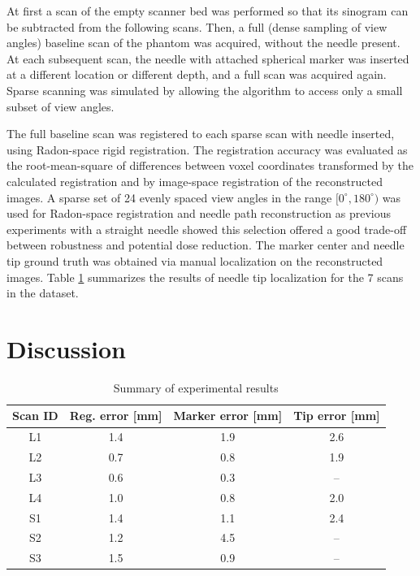 \documentclass[letterpaper, 10 pt, conference]{ieeeconf}  %
\begin{document}
At first a scan of the empty scanner bed was performed so that its sinogram can be subtracted from the following scans. Then, a full (dense sampling of view angles) baseline scan of the phantom was acquired, without the needle present. At each subsequent scan, the needle with attached spherical marker was inserted at a different location or different depth, and a full scan was acquired again. Sparse scanning was simulated by allowing the algorithm to access only a small subset of view angles.

The full baseline scan was registered to each sparse scan with needle inserted, using Radon-space rigid registration. The registration accuracy was evaluated as the root-mean-square of differences between voxel coordinates transformed by the calculated registration and by image-space registration of the reconstructed images. 
A sparse set of 24 evenly spaced view angles in the range $[0^\circ,180^\circ)$ was used for Radon-space registration and needle path reconstruction as previous experiments \cite{medan2017reduced} with a straight needle showed this selection offered a good trade-off between robustness and potential dose reduction.
The marker center and needle tip ground truth was obtained via manual localization on the reconstructed images.
Table \ref{results_table} summarizes the results of needle tip localization for the 7 scans in the dataset.

\section{Discussion}

\begin{table}[b]
\caption{Summary of experimental results}
\label{results_table}
\begin{center}
\begin{tabular}{|c||c|c|c|}
\hline
Scan ID & Reg. error [mm] & Marker error [mm] & Tip error [mm]\\
\hline
\hline
L1 & 1.4 & 1.9 & 2.6\\
\hline
L2 & 0.7 & 0.8 & 1.9\\
\hline
L3 & 0.6 & 0.3 & --\\
\hline
L4 & 1.0 & 0.8 & 2.0\\
\hline
S1 & 1.4 & 1.1 & 2.4\\
\hline
S2 & 1.2 & 4.5 & --\\
\hline
S3 & 1.5 & 0.9 & --\\
\hline
\end{tabular}
\end{center}
\end{table}
\end{document}
